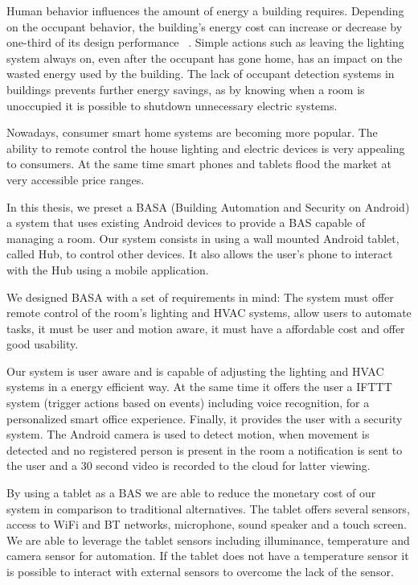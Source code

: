 \documentclass[conference]{IEEEtran}
\begin{document}
Human behavior influences the amount of energy a building requires. Depending on the occupant behavior, the building's energy cost can increase or decrease by one-third of its design performance ~\cite{ocupancy2}. Simple actions such as leaving the lighting system always on, even after the occupant has gone home, has an impact on the wasted energy used by the building. The lack of occupant detection systems in buildings prevents further energy savings, as by knowing when a room is unoccupied it is possible to shutdown unnecessary electric systems.

Nowadays, consumer smart home systems are becoming more popular. The ability to remote control the house lighting and electric devices is very appealing to consumers. At the same time smart phones and tablets flood the market at very accessible price ranges.

In this thesis, we preset a BASA (Building Automation and Security on Android) a system that uses existing Android devices to provide a \ac{BAS} capable of managing a room. Our system consists in using a wall mounted Android tablet, called Hub, to control other devices. It also allows the user's phone to interact with the Hub using a mobile application.

We designed BASA with a set of requirements in mind: The system must offer remote control of the room's lighting and \ac{HVAC} systems, allow users to automate tasks, it must be user and motion aware, it must have a affordable cost and offer good usability.

Our system is user aware and is capable of adjusting the lighting and \ac{HVAC} systems in a energy efficient way. At the same time it offers the user a \ac{IFTTT} system (trigger actions based on events) including voice recognition, for a personalized smart office experience. Finally, it provides the user with a security system. The Android camera is used to detect motion, when movement is detected and no registered person is present in the room a notification is sent to the user and a 30 second video is recorded to the cloud for latter viewing.

By using a tablet as a \ac{BAS} we are able to reduce the monetary cost of our system in comparison to traditional alternatives. The tablet offers several sensors, access to \ac{WiFi} and \ac{BT} networks, microphone, sound speaker and a touch screen. We are able to leverage the tablet sensors including illuminance, temperature and camera sensor for automation. If the tablet does not have a temperature sensor it is possible to interact with external sensors to overcome the lack of the sensor.
\end{document}
